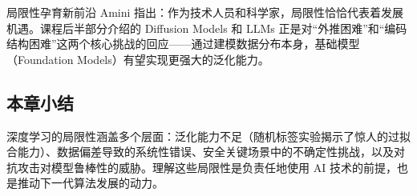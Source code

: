 \begin{knowledgebox}{局限性孕育新前沿}
Amini 指出：作为技术人员和科学家，局限性恰恰代表着发展机遇。课程后半部分介绍的 Diffusion Models 和 LLMs 正是对``外推困难''和``编码结构困难''这两个核心挑战的回应——通过建模数据分布本身，基础模型（Foundation Models）有望实现更强大的泛化能力。
\end{knowledgebox}

\subsection{本章小结}

深度学习的局限性涵盖多个层面：泛化能力不足（随机标签实验揭示了惊人的过拟合能力）、数据偏差导致的系统性错误、安全关键场景中的不确定性挑战，以及对抗攻击对模型鲁棒性的威胁。理解这些局限性是负责任地使用 AI 技术的前提，也是推动下一代算法发展的动力。

